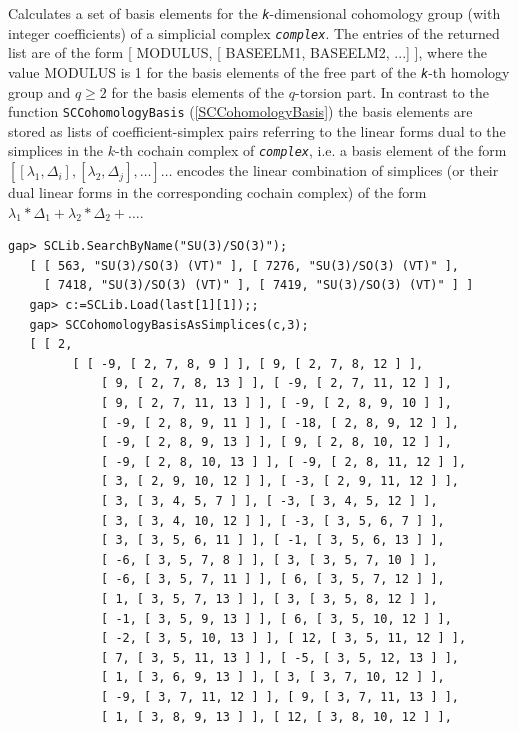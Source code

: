 \documentclass[a4paper,11pt]{report}
\begin{document}
{{{ Calculates a set of basis elements for the \mbox{\texttt{\mdseries\slshape k}}-dimensional cohomology group (with integer coefficients) of a simplicial
complex \mbox{\texttt{\mdseries\slshape complex}}. The entries of the returned list are of the form [ MODULUS, [ BASEELM1,
BASEELM2, ...] ], where the value MODULUS is 1 for the basis elements of the
free part of the \mbox{\texttt{\mdseries\slshape k}}-th homology group and $q\geq 2$ for the basis elements of the $q$-torsion part. In contrast to the function \texttt{SCCohomologyBasis} (\ref{SCCohomologyBasis}) the basis elements are stored as lists of coefficient-simplex pairs referring
to the linear forms dual to the simplices in the $k$-th cochain complex of \mbox{\texttt{\mdseries\slshape complex}}, i.e. a basis element of the form $[ [ \lambda_1, \Delta_i], [\lambda_2, \Delta_j], \dots ] \dots$ encodes the linear combination of simplices (or their dual linear forms in the
corresponding cochain complex) of the form $\lambda_1*\Delta_1+\lambda_2*\Delta_2 + \dots$. 
\begin{Verbatim}[commandchars=!@|,fontsize=\small,frame=single,label=Example]
   gap> SCLib.SearchByName("SU(3)/SO(3)");   
   [ [ 563, "SU(3)/SO(3) (VT)" ], [ 7276, "SU(3)/SO(3) (VT)" ], 
     [ 7418, "SU(3)/SO(3) (VT)" ], [ 7419, "SU(3)/SO(3) (VT)" ] ]
   gap> c:=SCLib.Load(last[1][1]);;
   gap> SCCohomologyBasisAsSimplices(c,3);
   [ [ 2, 
         [ [ -9, [ 2, 7, 8, 9 ] ], [ 9, [ 2, 7, 8, 12 ] ], 
             [ 9, [ 2, 7, 8, 13 ] ], [ -9, [ 2, 7, 11, 12 ] ], 
             [ 9, [ 2, 7, 11, 13 ] ], [ -9, [ 2, 8, 9, 10 ] ], 
             [ -9, [ 2, 8, 9, 11 ] ], [ -18, [ 2, 8, 9, 12 ] ], 
             [ -9, [ 2, 8, 9, 13 ] ], [ 9, [ 2, 8, 10, 12 ] ], 
             [ -9, [ 2, 8, 10, 13 ] ], [ -9, [ 2, 8, 11, 12 ] ], 
             [ 3, [ 2, 9, 10, 12 ] ], [ -3, [ 2, 9, 11, 12 ] ], 
             [ 3, [ 3, 4, 5, 7 ] ], [ -3, [ 3, 4, 5, 12 ] ], 
             [ 3, [ 3, 4, 10, 12 ] ], [ -3, [ 3, 5, 6, 7 ] ], 
             [ 3, [ 3, 5, 6, 11 ] ], [ -1, [ 3, 5, 6, 13 ] ], 
             [ -6, [ 3, 5, 7, 8 ] ], [ 3, [ 3, 5, 7, 10 ] ], 
             [ -6, [ 3, 5, 7, 11 ] ], [ 6, [ 3, 5, 7, 12 ] ], 
             [ 1, [ 3, 5, 7, 13 ] ], [ 3, [ 3, 5, 8, 12 ] ], 
             [ -1, [ 3, 5, 9, 13 ] ], [ 6, [ 3, 5, 10, 12 ] ], 
             [ -2, [ 3, 5, 10, 13 ] ], [ 12, [ 3, 5, 11, 12 ] ], 
             [ 7, [ 3, 5, 11, 13 ] ], [ -5, [ 3, 5, 12, 13 ] ], 
             [ 1, [ 3, 6, 9, 13 ] ], [ 3, [ 3, 7, 10, 12 ] ], 
             [ -9, [ 3, 7, 11, 12 ] ], [ 9, [ 3, 7, 11, 13 ] ], 
             [ 1, [ 3, 8, 9, 13 ] ], [ 12, [ 3, 8, 10, 12 ] ], 

\end{Verbatim}}}}
\end{document}
